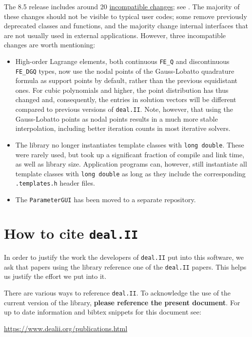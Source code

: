 \documentclass{ansarticle-preprint}
\newcommand{\specialword}[1]{\texttt{#1}}
\newcommand{\dealii}{{\specialword{deal.II}}}
\begin{document}
The 8.5 release includes around 20
\href{https://www.dealii.org/8.5.0/doxygen/deal.II/changes_between_8_4_2_and_8_5_0.html}{
incompatible changes}; see \cite{changes85}. The majority of these changes
should not be visible to typical user codes; some remove previously
deprecated classes and functions, and the majority change internal
interfaces that are not usually used in external applications. However, three
incompatible changes are worth mentioning:
\begin{itemize}
  \item High-order Lagrange elements, both continuous \verb!FE_Q! and
    discontinuous \verb!FE_DGQ! types, now use the nodal points of the
    Gauss-Lobatto quadrature formula as support points by default, rather than the
    previous equidistant ones. For cubic polynomials and higher, the point
    distribution has thus changed and, consequently, the entries in
    solution vectors will be different compared to previous
    versions of \dealii{}. Note, however, that using the Gauss-Lobatto points as nodal
    points results in a much more stable interpolation, including better
    iteration counts in most iterative solvers.
  \item
    The library no longer instantiates template classes with \texttt{long
    double}. These were rarely used, but took up a significant
    fraction of compile and link time, as well as library
    size. Application programs can, however, still instantiate all
    template classes with \texttt{long
    double} as long as they include the corresponding \texttt{.templates.h}
    header files.
  \item
    The \texttt{ParameterGUI} has been moved to a separate repository.
\end{itemize}



\section{How to cite \dealii{}}\label{sec:cite}

In order to justify the work the developers of \dealii{} put into this
software, we ask that papers using the library reference one of the
\dealii{} papers. This helps us justify the effort we put into it.

There are various ways to reference \dealii{}. To acknowledge the use of the
current version of the library, \textbf{please reference the present document}. For up
to date information and bibtex snippets for this document see:
\begin{center}
 \url{https://www.dealii.org/publications.html}
\end{center}
\end{document}
